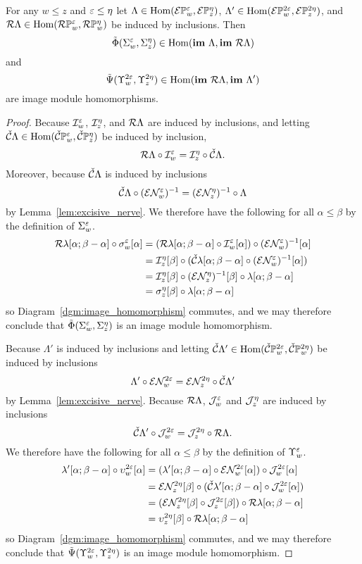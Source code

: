 \begin{lemma}\label{lem:rips_homomorphisms}
  For any $w\leq z$ and $\varepsilon\leq\eta$ let $\Lambda\in\mathrm{Hom}(\mathcal{E} \mathbb{P}_{w}^{\varepsilon}, \mathcal{E} \mathbb{P}_{z}^{\eta})$, $\Lambda'\in\mathrm{Hom}(\mathcal{E} \mathbb{P}_{w}^{2\varepsilon},\mathcal{E} \mathbb{P}_{z}^{2\eta})$, and $\mathcal{R}\Lambda\in\mathrm{Hom}(\mathcal{R}\mathbb{P}_{w}^{\varepsilon},\mathcal{R}\mathbb{P}_{w}^{\eta})$ be induced by inclusions.
  Then
  \[ \tilde{\Phi}(\Sigma_w^\varepsilon,\Sigma_z^\eta)\in\mathrm{Hom}(\mathbf{im}~\Lambda,\mathbf{im}~\mathcal{R}\Lambda)\]
  and
  \[ \tilde{\Psi}(\Upsilon_w^{2\varepsilon},\Upsilon_z^{2\eta})\in\mathrm{Hom}(\mathbf{im}~\mathcal{R}\Lambda,\mathbf{im}~\Lambda')\]
  are image module homomorphisms.
\end{lemma}
\begin{proof}
  Because $\mathcal{I}_w^\varepsilon$, $\mathcal{I}_z^\eta$, and $\mathcal{R}\Lambda$ are induced by inclusions, and letting $\check{\mathcal{C}}\Lambda\in\mathrm{Hom}(\check{\mathcal{C}}\mathbb{P}_{w}^{\varepsilon},\check{\mathcal{C}}\mathbb{P}_{z}^{\eta})$ be induced by inclusion,
  \[ \mathcal{R}\Lambda\circ\mathcal{I}_w^\varepsilon = \mathcal{I}_z^\eta\circ\check{\mathcal{C}}\Lambda.\]
  Moreover, because $\check{\mathcal{C}}\Lambda$ is induced by inclusions
  \[\check{\mathcal{C}}\Lambda\circ(\mathcal{E}\mathcal{N}_w^\varepsilon)^{-1} = (\mathcal{E}\mathcal{N}_z^\eta)^{-1}\circ\Lambda\]
  by Lemma~\ref{lem:excisive_nerve}.
  We therefore have the following for all $\alpha\leq\beta$ by the definition of $\Sigma_w^\varepsilon$.
  \begin{align*}
    \mathcal{R}\lambda[\alpha;\beta-\alpha]\circ\sigma_w^\varepsilon[\alpha] &= (\mathcal{R}\lambda[\alpha;\beta-\alpha]\circ\mathcal{I}_w^\varepsilon[\alpha])\circ (\mathcal{E}\mathcal{N}_w^\varepsilon)^{-1}[\alpha]\\
      &= \mathcal{I}_z^\eta[\beta]\circ(\check{\mathcal{C}}\lambda[\alpha;\beta-\alpha]\circ (\mathcal{E}\mathcal{N}_w^\varepsilon)^{-1}[\alpha])\\
      &= \mathcal{I}_z^\eta[\beta]\circ (\mathcal{E}\mathcal{N}_z^\eta)^{-1}[\beta]\circ\lambda[\alpha;\beta-\alpha]\\
      &= \sigma_z^\eta[\beta]\circ\lambda[\alpha;\beta-\alpha]
  \end{align*}
  so Diagram~\ref{dgm:image_homomorphism} commutes, and we may therefore conclude that $\tilde{\Phi}(\Sigma_w^\varepsilon,\Sigma_z^\eta)$ is an image module homomorphism.

  Because $\Lambda'$ is induced by inclusions and letting $\check{\mathcal{C}}\Lambda'\in\mathrm{Hom}(\check{\mathcal{C}}\mathbb{P}_{w}^{2\varepsilon},\check{\mathcal{C}}\mathbb{P}_{w}^{2\eta})$ be induced by inclusions
  \[\Lambda'\circ\mathcal{E}\mathcal{N}_w^{2\varepsilon} = \mathcal{E}\mathcal{N}_z^{2\eta}\circ \check{\mathcal{C}}\Lambda'\]
  by Lemma~\ref{lem:excisive_nerve}.
  Because $\mathcal{R}\Lambda$, $\mathcal{J}_w^\varepsilon$ and $\mathcal{J}_z^\eta$ are induced by inclusions
  \[ \check{\mathcal{C}}\Lambda'\circ \mathcal{J}_w^{2\varepsilon} = \mathcal{J}_z^{2\eta}\circ\mathcal{R}\Lambda.\]
  We therefore have the following for all $\alpha\leq\beta$ by the definition of $\Upsilon_w^\varepsilon$.
  \begin{align*}
    \lambda'[\alpha;\beta-\alpha]\circ \upsilon_w^{2\varepsilon}[\alpha] &= (\lambda'[\alpha;\beta-\alpha]\circ \mathcal{E}\mathcal{N}_w^{2\varepsilon}[\alpha])\circ \mathcal{J}_w^{2\varepsilon}[\alpha]\\
      &=\mathcal{E}\mathcal{N}_z^{2\eta}[\beta]\circ(\check{\mathcal{C}}\lambda'[\alpha;\beta-\alpha]\circ\mathcal{J}_w^{2\varepsilon}[\alpha])\\
      &=(\mathcal{E}\mathcal{N}_z^{2\eta}[\beta]\circ\mathcal{J}_z^{2\varepsilon}[\beta])\circ\mathcal{R}\lambda[\alpha;\beta-\alpha]\\
      &=\upsilon_z^{2\eta}[\beta]\circ\mathcal{R}\lambda[\alpha;\beta-\alpha]
  \end{align*}
  so Diagram~\ref{dgm:image_homomorphism} commutes, and we may therefore conclude that $\tilde{\Psi}(\Upsilon_w^{2\varepsilon},\Upsilon_z^{2\eta})$ is an image module homomorphism.
\end{proof}

